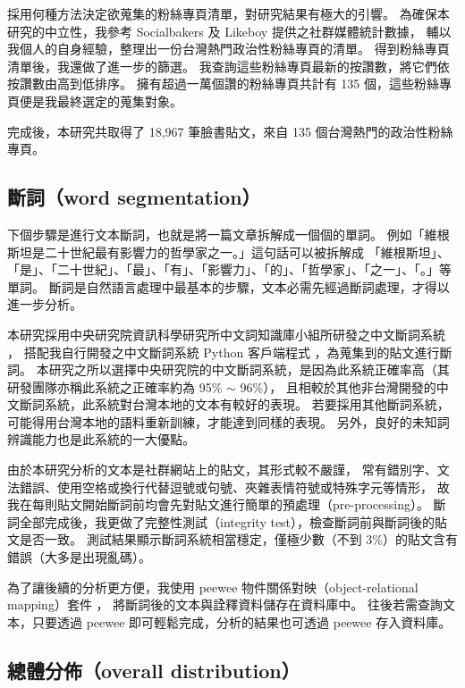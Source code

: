 \documentclass[letterpaper, 10pt, conference]{ieeeconf}   %
\begin{document}
\begin{CJK}{UTF8}{bsmi}
採用何種方法決定欲蒐集的粉絲專頁清單，對研究結果有極大的引響。
為確保本研究的中立性，我參考 Socialbakers \cite{c4} 及 Likeboy \cite{c5} 提供之社群媒體統計數據，
輔以我個人的自身經驗，整理出一份台灣熱門政治性粉絲專頁的清單。
得到粉絲專頁清單後，我還做了進一步的篩選。
我查詢這些粉絲專頁最新的按讚數，將它們依按讚數由高到低排序。
擁有超過一萬個讚的粉絲專頁共計有 135 個，這些粉絲專頁便是我最終選定的蒐集對象。

完成後，本研究共取得了 18,967 筆臉書貼文，來自 135 個台灣熱門的政治性粉絲專頁。

\subsection*{斷詞（word segmentation）}

下個步驟是進行文本斷詞，也就是將一篇文章拆解成一個個的單詞。
例如「維根斯坦是二十世紀最有影響力的哲學家之一。」這句話可以被拆解成
「維根斯坦」、「是」、「二十世紀」、「最」、「有」、「影響力」、「的」、「哲學家」、「之一」、「。」等單詞。
斷詞是自然語言處理中最基本的步驟，文本必需先經過斷詞處理，才得以進一步分析。

本研究採用中央研究院資訊科學研究所中文詞知識庫小組所研發之中文斷詞系統 \cite{c6}，
搭配我自行開發之中文斷詞系統 Python 客戶端程式 \cite{c7}，為蒐集到的貼文進行斷詞。
本研究之所以選擇中央研究院的中文斷詞系統，是因為此系統正確率高（其研發團隊亦稱此系統之正確率約為 95\% $\sim$ 96\%），
且相較於其他非台灣開發的中文斷詞系統，此系統對台灣本地的文本有較好的表現。
若要採用其他斷詞系統，可能得用台灣本地的語料重新訓練，才能達到同樣的表現。
另外，良好的未知詞辨識能力也是此系統的一大優點。

由於本研究分析的文本是社群網站上的貼文，其形式較不嚴謹，
常有錯別字、文法錯誤、使用空格或換行代替逗號或句號、夾雜表情符號或特殊字元等情形，
故我在每則貼文開始斷詞前均會先對貼文進行簡單的預處理（pre-processing）。
斷詞全部完成後，我更做了完整性測試（integrity test），檢查斷詞前與斷詞後的貼文是否一致。
測試結果顯示斷詞系統相當穩定，僅極少數（不到 3\%）的貼文含有錯誤（大多是出現亂碼）。

為了讓後續的分析更方便，我使用 peewee 物件關係對映（object-relational mapping）套件 \cite{c8}，
將斷詞後的文本與詮釋資料儲存在資料庫中。
往後若需查詢文本，只要透過 peewee 即可輕鬆完成，分析的結果也可透過 peewee 存入資料庫。

\subsection*{總體分佈（overall distribution）}


\end{CJK}
\end{document}
